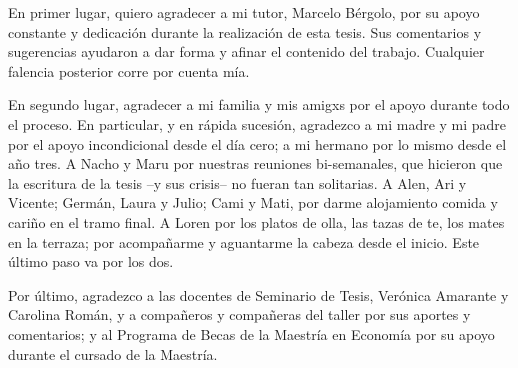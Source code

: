 En primer lugar, quiero agradecer a mi tutor, Marcelo Bérgolo, por su apoyo constante y dedicación durante la realización de esta tesis. Sus comentarios y sugerencias ayudaron a dar forma y afinar el contenido del trabajo. Cualquier falencia posterior corre por cuenta mía.

En segundo lugar, agradecer a mi familia y mis amigxs por el apoyo durante todo el proceso. En particular, y en rápida sucesión, agradezco a mi madre y mi padre por el apoyo incondicional desde el día cero; a mi hermano por lo mismo desde el año tres. A Nacho y Maru por nuestras reuniones bi-semanales, que hicieron que la escritura de la tesis –y sus crisis– no fueran tan solitarias. A Alen, Ari y Vicente; Germán, Laura y Julio; Cami y Mati, por darme alojamiento comida y cariño en el tramo final. A Loren por los platos de olla, las tazas de te, los mates en la terraza; por acompañarme y aguantarme la cabeza desde el inicio. Este último paso va por los dos.

Por último, agradezco a las docentes de Seminario de Tesis, Verónica Amarante y Carolina Román, y a compañeros y compañeras del taller por sus aportes y comentarios; y al Programa de Becas de la Maestría en Economía por su apoyo durante el cursado de la Maestría.
